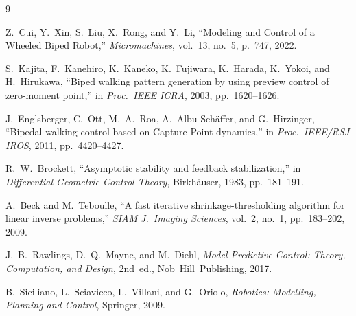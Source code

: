 \documentclass[11pt,a4paper]{article}
\begin{document}
\begin{thebibliography}{9}

Z.\ Cui, Y.\ Xin, S.\ Liu, X.\ Rong, and Y.\ Li,
``Modeling and Control of a Wheeled Biped Robot,''
\emph{Micromachines}, vol.\ 13, no.\ 5, p.\ 747, 2022.

S.\ Kajita, F.\ Kanehiro, K.\ Kaneko, K.\ Fujiwara, K.\ Harada, K.\ Yokoi, and H.\ Hirukawa,
``Biped walking pattern generation by using preview control of zero-moment point,''
in \emph{Proc.\ IEEE ICRA}, 2003, pp.\ 1620--1626.

J.\ Englsberger, C.\ Ott, M.\ A.\ Roa, A.\ Albu-Sch\"affer, and G.\ Hirzinger,
``Bipedal walking control based on Capture Point dynamics,''
in \emph{Proc.\ IEEE/RSJ IROS}, 2011, pp.\ 4420--4427.

R.\ W.\ Brockett,
``Asymptotic stability and feedback stabilization,''
in \emph{Differential Geometric Control Theory}, Birkh\"auser, 1983, pp.\ 181--191.

A.\ Beck and M.\ Teboulle,
``A fast iterative shrinkage-thresholding algorithm for linear inverse problems,''
\emph{SIAM J.\ Imaging Sciences}, vol.\ 2, no.\ 1, pp.\ 183--202, 2009.

J.\ B.\ Rawlings, D.\ Q.\ Mayne, and M.\ Diehl,
\emph{Model Predictive Control: Theory, Computation, and Design}, 2nd~ed.,
Nob~Hill~Publishing, 2017.

B.\ Siciliano, L.\ Sciavicco, L.\ Villani, and G.\ Oriolo,
\emph{Robotics: Modelling, Planning and Control},
Springer, 2009.

\end{thebibliography}
\end{document}
